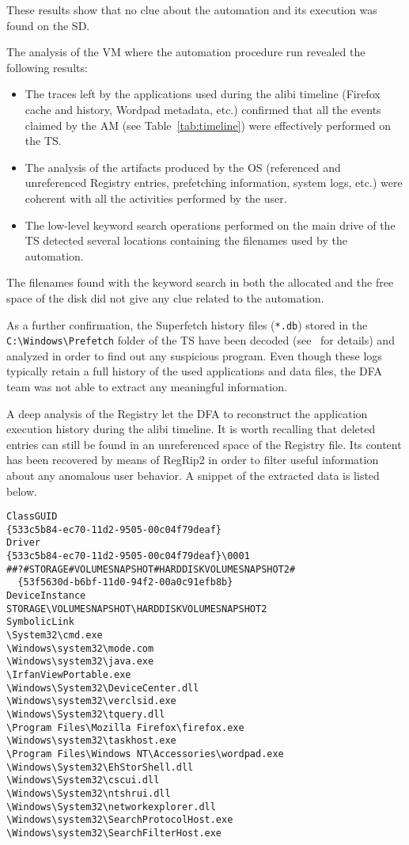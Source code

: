 \documentclass[10pt, conference]{IEEEtran}
\begin{document}
These results show that no clue about the automation and its execution was found on the SD.

 The analysis of the VM where the automation procedure run revealed the following results:

\begin{itemize}
 \item The traces left by the applications used during the alibi timeline (Firefox cache and history, Wordpad metadata, etc.) confirmed that all the events claimed by the AM (see Table~\ref{tab:timeline}) were effectively performed on the TS. 
 \item The analysis of the artifacts produced by the OS (referenced and unreferenced Registry entries, prefetching information, system logs, etc.) were coherent with all the activities performed by the user.
 \item The low-level keyword search operations performed on the main drive of the TS detected several locations containing the filenames used by the automation.
\end{itemize}

The filenames found with the keyword search in both the allocated and the free space of the disk did not give any clue related to the automation.

As a further confirmation, the Superfetch history files (\verb=*.db=) stored in the \verb=C:\Windows\Prefetch= folder of the TS have been decoded (see~\cite{rewolf} for details) and analyzed in order to find out any suspicious program. Even though these logs typically retain a full history of the used applications and data files, the DFA team was not able to extract any meaningful information. 

A deep analysis of the Registry let the DFA to reconstruct the application execution history during the alibi timeline. It is worth recalling that deleted entries can still be found in an unreferenced space of the Registry file. Its content has been recovered by means of RegRip2 in order to filter useful information about any anomalous user behavior. A snippet of the extracted data is listed below. 

\begin{lstlisting}
ClassGUID
{533c5b84-ec70-11d2-9505-00c04f79deaf}
Driver
{533c5b84-ec70-11d2-9505-00c04f79deaf}\0001
##?#STORAGE#VOLUMESNAPSHOT#HARDDISKVOLUMESNAPSHOT2#
  {53f5630d-b6bf-11d0-94f2-00a0c91efb8b}
DeviceInstance
STORAGE\VOLUMESNAPSHOT\HARDDISKVOLUMESNAPSHOT2
SymbolicLink
\System32\cmd.exe
\Windows\system32\mode.com
\Windows\system32\java.exe
\IrfanViewPortable.exe
\Windows\System32\DeviceCenter.dll
\Windows\system32\verclsid.exe
\Windows\System32\tquery.dll
\Program Files\Mozilla Firefox\firefox.exe
\Windows\system32\taskhost.exe
\Program Files\Windows NT\Accessories\wordpad.exe
\Windows\System32\EhStorShell.dll
\Windows\System32\cscui.dll
\Windows\System32\ntshrui.dll
\Windows\System32\networkexplorer.dll
\Windows\system32\SearchProtocolHost.exe
\Windows\system32\SearchFilterHost.exe
\end{lstlisting}
\end{document}
